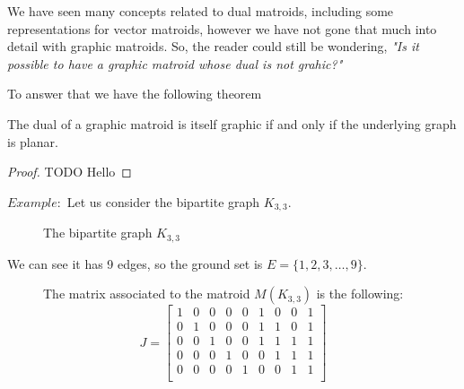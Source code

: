 %

We have seen many concepts related to dual matroids, including some representations for vector matroids, however we have not gone that much into detail with graphic matroids. So, the reader could still be wondering, \textit{"Is it possible to have a graphic matroid whose dual is not grahic?"}

To answer that we have the following theorem

\begin{theorem}
    \item  The dual of a graphic matroid is itself graphic if and only if the underlying graph is planar.
\end{theorem}

\begin{proof}
    TODO
    Hello
\end{proof}



$Example:$ Let us consider the bipartite graph $K_{3,3}$.
\begin{figure}[H]
\centering
{}
    \caption{The bipartite graph $K_{3,3}$}
    \label{fig:enter-label}
\end{figure}

We can see it has 9 edges, so the ground set is $E=\{1,2,3, \dots, 9\} $.

\begin{figure}[H]
The matrix associated to the matroid $M(K_{3,3})$ is the following:
$$J = \begin{bmatrix}
    1 & 0 & 0 & 0 & 0 & 1 & 0 & 0 & 1\\
    0 & 1 & 0 & 0 & 0 & 1 & 1 & 0 & 1\\
    0 & 0 & 1 & 0 & 0 & 1 & 1 & 1 & 1\\
    0 & 0 & 0 & 1 & 0 & 0 & 1 & 1 & 1\\
    0 & 0 & 0 & 0 & 1 & 0 & 0 & 1 & 1\\
\end{bmatrix}$$
\end{figure}

